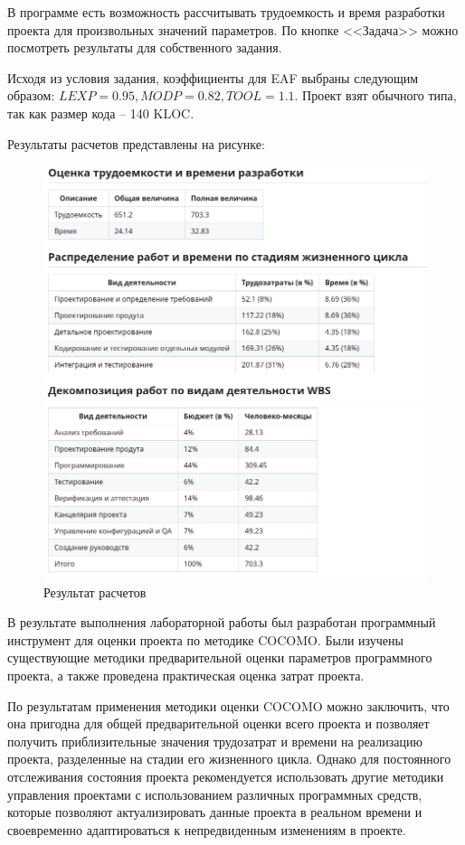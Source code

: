 В программе есть возможность рассчитывать трудоемкость и время разработки проекта для произвольных значений параметров.
По кнопке <<Задача>> можно посмотреть результаты для собственного задания.

Исходя из условия задания, коэффициенты для EAF выбраны следующим образом: $LEXP = 0.95, MODP = 0.82, TOOL = 1.1$.
Проект взят обычного типа, так как размер кода -- 140 KLOC.

\newpage
Результаты расчетов представлены на рисунке:
\FloatBarrier
\begin{figure}[h]	
	\begin{center}
		\includegraphics[width=\linewidth]{inc/table.png}
	\end{center}
	\captionsetup{justification=centering}
	\caption{Результат расчетов}
\end{figure}
\FloatBarrier 

\newpage
{}
В результате выполнения лабораторной работы был разработан программный инструмент для оценки проекта по методике COCOMO. 
Были изучены существующие методики предварительной оценки параметров программного проекта, а также проведена практическая оценка затрат проекта.

По результатам применения методики оценки COCOMO можно заключить, что она пригодна для общей предварительной оценки всего проекта и позволяет получить приблизительные значения трудозатрат и времени на реализацию проекта, разделенные на стадии его жизненного цикла.
Однако для постоянного отслеживания состояния проекта рекомендуется использовать другие методики управления проектами с использованием различных программных средств, которые позволяют актуализировать данные проекта в реальном времени и своевременно адаптироваться к непредвиденным изменениям в проекте.